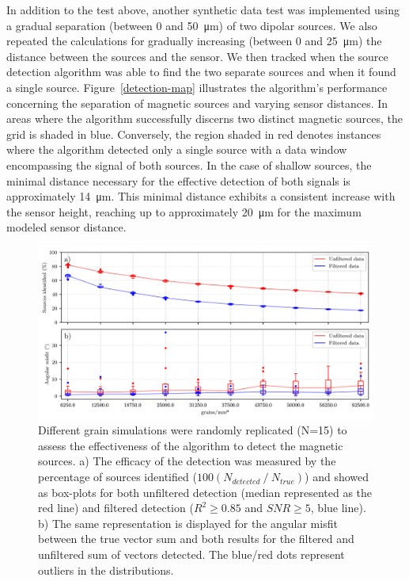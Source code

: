 In addition to the test above, another synthetic data test was implemented using a gradual separation (between 0 and \qty{50}{\um}) of two dipolar sources. We also repeated the calculations for gradually increasing (between 0 and \qty{25}{\um}) the distance between the sources and the sensor. We then tracked when the source detection algorithm was able to find the two separate sources and when it found a single source. Figure~\ref{detection-map} illustrates the algorithm's performance concerning the separation of magnetic sources and varying sensor distances. In areas where the algorithm successfully discerns two distinct magnetic sources, the grid is shaded in blue. Conversely, the region shaded in red denotes instances where the algorithm detected only a single source with a data window encompassing the signal of both sources. In the case of shallow sources, the minimal distance necessary for the effective detection of both signals is approximately \qty{14}{\um}. This minimal distance exhibits a consistent increase with the sensor height, reaching up to approximately \qty{20}{\um} for the maximum modeled sensor distance.

\begin{figure}[tb!]
  \centering
  \includegraphics[width=1\linewidth]{figures/grain_concentration.png}
  \caption{
  Different grain simulations were randomly replicated (N=15) to assess the effectiveness of the algorithm to detect the magnetic sources. a) The efficacy of the detection was measured by the percentage of sources identified ($100 \left( N_{detected} ~/~ N_{true} \right)$) and showed as box-plots for both unfiltered detection (median represented as the red line) and filtered detection ($R^2 \geq 0.85$ and $SNR \geq 5$, blue line). b) The same representation is displayed for the angular misfit between the true vector sum and both results for the filtered and unfiltered sum of vectors detected. The blue/red dots represent outliers in the distributions.
  }
  \label{grain-concentration}
\end{figure}


